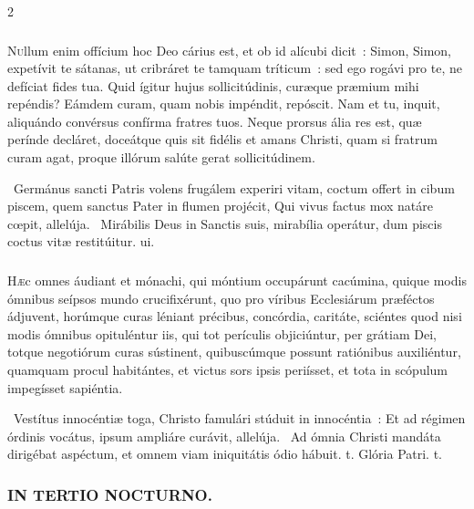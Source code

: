 \documentclass[9pt,twoside]{extarticle}
\begin{document}
\begin{multicols}{2}
{{\subsubsection*{\center {}}
\lettrine{N}ullum enim offícium hoc Deo cárius est, et ob id alícubi dicit~: Simon, Simon, expetívit te sátanas, ut cribráret te tamquam tríticum~: sed ego rogávi pro te, ne defíciat fides tua. Quid ígitur hujus sollicitúdinis, curæque præmium mihi repéndis? Eámdem curam, quam nobis impéndit, repóscit. Nam et tu, inquit, aliquándo convérsus confírma fratres tuos. Neque prorsus ália res est, quæ perínde decláret, doceátque quis sit fidélis et amans Christi, quam si fratrum curam agat, proque illórum salúte gerat sollicitúdinem.

\begin{tightlist}{}
\item {}~Germánus sancti Patris volens frugálem experiri vitam, coctum offert in cibum piscem, quem sanctus Pater in flumen projécit, \textred{*} Qui vivus factus mox natáre cœpit, allelúja. ~Mirábilis Deus in Sanctis suis, mirabília operátur, dum piscis coctus vitæ restitúitur. ui.
\end{tightlist}

\subsubsection*{\center {}}
\lettrine{H}æc omnes áudiant et mónachi, qui móntium occupárunt cacúmina, quique modis ómnibus seípsos mundo crucifixérunt, quo pro víribus Ecclesiárum præféctos ádjuvent, horúmque curas léniant précibus, concórdia, caritáte, sciéntes quod nisi modis ómnibus opituléntur iis, qui tot perículis objiciúntur, per grátiam Dei, totque negotiórum curas sústinent, quibuscúmque possunt ratiónibus auxiliéntur, quamquam procul habitántes, et victus sors ipsis periísset, et tota in scópulum impegísset sapiéntia.

\begin{tightlist}{}
\item {}~Vestítus innocéntiæ toga, Christo famulári stúduit in innocéntia~: \textred{*} Et ad régimen órdinis vocátus, ipsum ampliáre curávit, allelúja. ~Ad ómnia Christi mandáta dirigébat aspéctum, et omnem viam iniquitátis ódio hábuit. t. Glória Patri. t.
\end{tightlist}

\subsubsection*{\center \textsc{IN TERTIO NOCTURNO.}}
}}
\end{multicols}
\end{document}
